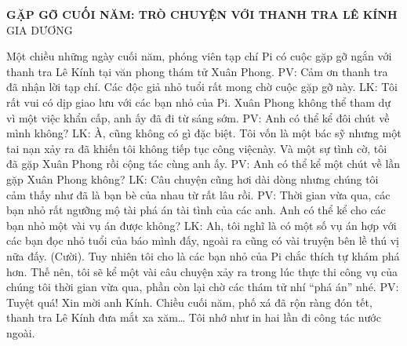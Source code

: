 \newpage
\graphicspath{{../suyluancungbi/xuanphong/}}
	\begin{center}
			\textbf{\Large\color{toancuabi} GẶP GỠ CUỐI NĂM: TRÒ CHUYỆN VỚI THANH TRA LÊ KÍNH}\\
			GIA DƯƠNG
		\end{center}
%	
%	
%	
	Một chiều những ngày cuối năm, phóng viên tạp chí Pi có cuộc gặp gỡ ngắn với thanh tra Lê Kính tại văn phong thám tử Xuân Phong.
	\vskip 0.1cm
	PV: Cảm ơn thanh tra đã nhận lời tạp chí. Các độc giả nhỏ tuổi rất mong chờ cuộc gặp gỡ này.
	\vskip 0.1cm
	LK: Tôi rất vui có dịp giao lưu với các bạn nhỏ của Pi. Xuân Phong không thể tham dự vì một việc khẩn cấp, anh ấy đã đi từ sáng sớm.
	\vskip 0.1cm
	PV: Anh có thể kể đôi chút về mình không?
	\vskip 0.1cm
	LK: À, cũng không có gì đặc biệt. Tôi vốn là một bác sỹ nhưng một tai nạn xảy ra đã khiến tôi không tiếp tục công việcnày. Và một sự tình cờ, tôi đã gặp Xuân Phong rồi  cộng tác cùng anh ấy. 
	\vskip 0.1cm
	PV: Anh có thể kể một chút về lần gặp Xuân Phong không?
	\vskip 0.1cm
	LK: Câu chuyện cũng hơi dài dòng nhưng chúng tôi cảm thấy như đã là bạn bè của nhau từ rất lâu rồi.
	\vskip 0.1cm
	PV: Thời gian vừa qua,  các bạn nhỏ rất ngưỡng mộ tài phá án tài tình của các anh. Anh có thể kể cho các bạn nhỏ một vài vụ án được không?
	\vskip 0.1cm
	LK: Ah, tôi  nghĩ là có một số vụ án hợp với các bạn đọc nhỏ tuổi của báo mình đấy, ngoài ra cũng có  vài truyện bên lề  thú vị nữa đấy. (Cười). Tuy nhiên tôi cho là các bạn nhỏ của Pi chắc thích tự khám phá hơn. Thế nên, tôi sẽ kể một vài câu chuyện xảy ra trong lúc thực thi công vụ của chúng tôi thời gian vừa qua, phần còn lại chờ các thám tử nhí “phá án” nhé.
	\vskip 0.1cm
	PV: Tuyệt quá! Xin mời anh Kính.
	\vskip 0.1cm
	Chiều cuối năm, phố xá đã rộn ràng đón tết, thanh tra Lê Kính đưa mắt xa xăm…
	Tôi nhớ như in hai lần đi công tác nước ngoài.
	\vskip 0.1cm
	\newpage
	
